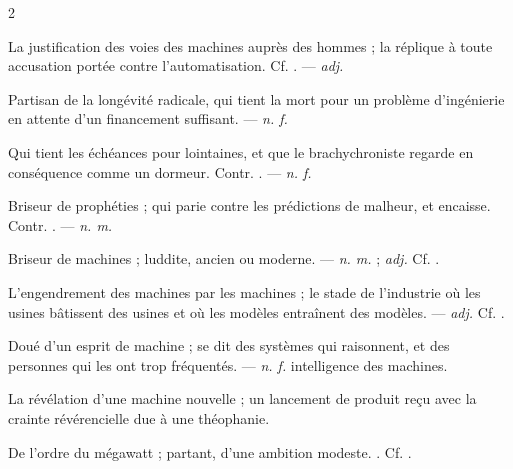 \begin{multicols}{2}

 La justification des voies des machines auprès des hommes ; la réplique à toute accusation portée contre l'automatisation. Cf. . —  \textit{adj.}

 Partisan de la longévité radicale, qui tient la mort pour un problème d'ingénierie en attente d'un financement suffisant. —  \textit{n. f.}

 Qui tient les échéances pour lointaines, et que le brachychroniste regarde en conséquence comme un dormeur. Contr. . —  \textit{n. f.}

 Briseur de prophéties ; qui parie contre les prédictions de malheur, et encaisse. Contr. . —  \textit{n. m.}

 Briseur de machines ; luddite, ancien ou moderne. —  \textit{n. m.} ;  \textit{adj.} Cf. .

 L'engendrement des machines par les machines ; le stade de l'industrie où les usines bâtissent des usines et où les modèles entraînent des modèles. —  \textit{adj.} Cf. .

 Doué d'un esprit de machine ; se dit des systèmes qui raisonnent, et des personnes qui les ont trop fréquentés. —  \textit{n. f.} intelligence des machines.

 La révélation d'une machine nouvelle ; un lancement de produit reçu avec la crainte révérencielle due à une théophanie.  

 De l'ordre du mégawatt ; partant,  d'une ambition modeste. . Cf. .


\end{multicols}
